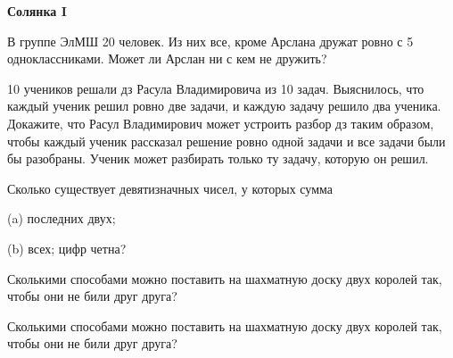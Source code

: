 \centerline{\bf \Huge Солянка I}
\centerline{\bf \Huge }

\begin{flushright}
        \scriptsize{}
\end{flushright}

В группе ЭлМШ 20 человек. Из них все, кроме Арслана дружат ровно с 5 одноклассниками. Может ли Арслан ни с кем не дружить?


10 учеников решали дз Расула Владимировича из 10 задач. Выяснилось, что каждый ученик решил ровно две задачи, и каждую задачу решило два ученика. 
Докажите, что Расул Владимирович может устроить разбор дз таким образом, чтобы каждый ученик рассказал решение ровно одной задачи и все задачи были бы разобраны. Ученик может разбирать только ту задачу, которую он решил.

Сколько существует девятизначных чисел, у которых сумма 

(a) последних двух;

(b) всех; цифр четна?


Сколькими способами можно поставить на шахматную доску двух королей так, чтобы они не били друг друга?  

Сколькими способами можно поставить на шахматную доску двух королей так, чтобы они не били друг друга?